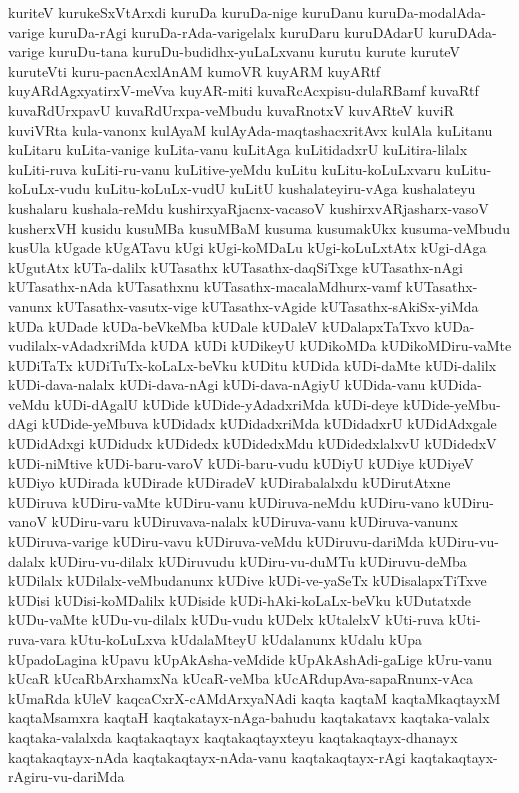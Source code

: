 {kuriteV
kurukeSxVtArxdi
kuruDa
kuruDa-nige
kuruDanu
kuruDa-modalAda-varige
kuruDa-rAgi
kuruDa-rAda-varigelalx
kuruDaru
kuruDAdarU
kuruDAda-varige
kuruDu-tana
kuruDu-budidhx-yuLaLxvanu
kurutu
kurute
kuruteV
kuruteVti
kuru-pacnAcxlAnAM
kumoVR
kuyARM
kuyARtf
kuyARdAgxyatirxV-meVva
kuyAR-miti
kuvaRcAcxpisu-dulaRBamf
kuvaRtf
kuvaRdUrxpavU
kuvaRdUrxpa-veMbudu
kuvaRnotxV
kuvARteV
kuviR
kuviVRta
kula-vanonx
kulAyaM
kulAyAda-maqtashacxritAvx
kulAla
kuLitanu
kuLitaru
kuLita-vanige
kuLita-vanu
kuLitAga
kuLitidadxrU
kuLitira-lilalx
kuLiti-ruva
kuLiti-ru-vanu
kuLitive-yeMdu
kuLitu
kuLitu-koLuLxvaru
kuLitu-koLuLx-vudu
kuLitu-koLuLx-vudU
kuLitU
kushalateyiru-vAga
kushalateyu
kushalaru
kushala-reMdu
kushirxyaRjacnx-vacasoV
kushirxvARjasharx-vasoV
kusherxVH
kusidu
kusuMBa
kusuMBaM
kusuma
kusumakUkx
kusuma-veMbudu
kusUla
kUgade
kUgATavu
kUgi
kUgi-koMDaLu
kUgi-koLuLxtAtx
kUgi-dAga
kUgutAtx
kUTa-dalilx
kUTasathx
kUTasathx-daqSiTxge
kUTasathx-nAgi
kUTasathx-nAda
kUTasathxnu
kUTasathx-macalaMdhurx-vamf
kUTasathx-vanunx
kUTasathx-vasutx-vige
kUTasathx-vAgide
kUTasathx-sAkiSx-yiMda
kUDa
kUDade
kUDa-beVkeMba
kUDale
kUDaleV
kUDalapxTaTxvo
kUDa-vudilalx-vAdadxriMda
kUDA
kUDi
kUDikeyU
kUDikoMDa
kUDikoMDiru-vaMte
kUDiTaTx
kUDiTuTx-koLaLx-beVku
kUDitu
kUDida
kUDi-daMte
kUDi-dalilx
kUDi-dava-nalalx
kUDi-dava-nAgi
kUDi-dava-nAgiyU
kUDida-vanu
kUDida-veMdu
kUDi-dAgalU
kUDide
kUDide-yAdadxriMda
kUDi-deye
kUDide-yeMbu-dAgi
kUDide-yeMbuva
kUDidadx
kUDidadxriMda
kUDidadxrU
kUDidAdxgale
kUDidAdxgi
kUDidudx
kUDidedx
kUDidedxMdu
kUDidedxlalxvU
kUDidedxV
kUDi-niMtive
kUDi-baru-varoV
kUDi-baru-vudu
kUDiyU
kUDiye
kUDiyeV
kUDiyo
kUDirada
kUDirade
kUDiradeV
kUDirabalalxdu
kUDirutAtxne
kUDiruva
kUDiru-vaMte
kUDiru-vanu
kUDiruva-neMdu
kUDiru-vano
kUDiru-vanoV
kUDiru-varu
kUDiruvava-nalalx
kUDiruva-vanu
kUDiruva-vanunx
kUDiruva-varige
kUDiru-vavu
kUDiruva-veMdu
kUDiruvu-dariMda
kUDiru-vu-dalalx
kUDiru-vu-dilalx
kUDiruvudu
kUDiru-vu-duMTu
kUDiruvu-deMba
kUDilalx
kUDilalx-veMbudanunx
kUDive
kUDi-ve-yaSeTx
kUDisalapxTiTxve
kUDisi
kUDisi-koMDalilx
kUDiside
kUDi-hAki-koLaLx-beVku
kUDutatxde
kUDu-vaMte
kUDu-vu-dilalx
kUDu-vudu
kUDelx
kUtalelxV
kUti-ruva
kUti-ruva-vara
kUtu-koLuLxva
kUdalaMteyU
kUdalanunx
kUdalu
kUpa
kUpadoLagina
kUpavu
kUpAkAsha-veMdide
kUpAkAshAdi-gaLige
kUru-vanu
kUcaR
kUcaRbArxhamxNa
kUcaR-veMba
kUcARdupAva-sapaRnunx-vAca
kUmaRda
kUleV
kaqcaCxrX-cAMdArxyaNAdi
kaqta
kaqtaM
kaqtaMkaqtayxM
kaqtaMsamxra
kaqtaH
kaqtakatayx-nAga-bahudu
kaqtakatavx
kaqtaka-valalx
kaqtaka-valalxda
kaqtakaqtayx
kaqtakaqtayxteyu
kaqtakaqtayx-dhanayx
kaqtakaqtayx-nAda
kaqtakaqtayx-nAda-vanu
kaqtakaqtayx-rAgi
kaqtakaqtayx-rAgiru-vu-dariMda
}
